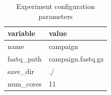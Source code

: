 \begin{table}[htbp]
\centering
\caption{Experiment configuration parameters}
\label{tab:table3}
\begin{tabular}{ll}
\toprule
variable & value \\
\midrule
name & campaign \\
fastq\_path & campaign.fastq.gz \\
save\_dir & ./ \\
num\_cores & 11 \\
\bottomrule
\end{tabular}
\end{table}

